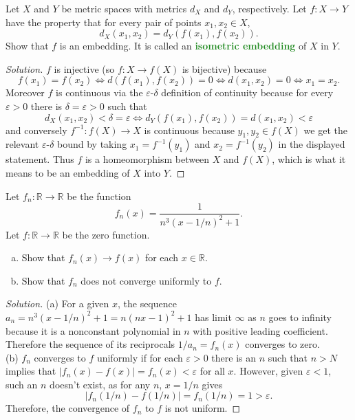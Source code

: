 \documentclass[10pt]{article}
\providecommand{\eps}{\varepsilon}
\providecommand{\RR}{\mathbb R}
\providecommand{\ii}{\item}
\providecommand{\inv}{^{-1}}
\newenvironment{soln}{\begin{proof}[Solution]}{\end{proof}}
\providecommand{\vocab}[1]{{\textbf{\textcolor{ForestGreen}{#1}}}}
\providecommand{\abs}[1]{\left|#1\right|}
\begin{document}
\begin{problem}
    [Munkres 21.2]
    Let $X$ and $Y$ be metric spaces with metrics $d_X$ and $d_Y$, respectively.
    Let $f\colon X\to Y$ have the property that
    for every pair of points $x_1,x_2\in X$,
    \begin{equation*}
	d_X(x_1,x_2) = d_Y(f(x_1), f(x_2)).
    \end{equation*}
    Show that $f$ is an embedding.
    It is called an \vocab{isometric embedding} of $X$ in $Y$.
\end{problem}

\begin{soln}
    $f$ is injective (so $f\colon X\to f(X)$ is bijective) because
    \begin{equation*}
        f(x_1)=f(x_2) \iff d(f(x_1),f(x_2)) = 0 \iff
	d(x_1,x_2)=0 \iff x_1=x_2.
    \end{equation*}
    Moreover $f$ is continuous via the $\eps$-$\delta$ definition of continuity
    because for every $\eps>0$ there is $\delta=\eps>0$ such that
    \begin{equation*}
	d_X(x_1,x_2) < \delta = \eps \iff d_Y(f(x_1),f(x_2)) = d(x_1,x_2) < \eps
    \end{equation*}
    and conversely $f\inv\colon f(X)\to X$ is continuous
    because $y_1,y_2\in f(X)$ we get the relevant $\eps$-$\delta$ bound
    by taking $x_1 = f\inv(y_1)$ and $x_2=f\inv(y_2)$ in the displayed statement.
    Thus $f$ is a homeomorphism between $X$ and $f(X)$,
    which is what it means to be an embedding of $X$ into $Y$.
\end{soln}

\begin{problem}
    [Munkres 21.9]
    Let $f_n\colon\RR\to\RR$ be the function
    \begin{equation*}
	f_n(x) = \frac{1}{n^3(x-1/n)^2 + 1}.
    \end{equation*}
    Let $f\colon\RR\to\RR$ be the zero function.
    \begin{enumerate}[(a)]
	\ii Show that $f_n(x)\to f(x)$ for each $x\in\RR$.
	\ii Show that $f_n$ does not converge uniformly to $f$.
\end{enumerate}
\end{problem}

\begin{soln}
    (a) For a given $x$, the sequence $a_n = n^3(x-1/n)^2 + 1 = n(nx - 1)^2 + 1$
    has limit $\infty$ as $n$ goes to infinity because
    it is a nonconstant polynomial in $n$
    with positive leading coefficient. Therefore the sequence
    of its reciprocals $1/a_n = f_n(x)$ converges to zero.\\

    (b) $f_n$ converges to $f$ uniformly if
    for each $\eps>0$ there is an $n$ such that $n>N$ implies that
    $|f_n(x) - f(x)| = f_n(x) < \eps$ for all $x$.
    However, given $\eps<1$, such an $n$ doesn't exist, as for any $n$,
    $x=1/n$ gives
    \begin{equation*}
	\abs{f_n(1/n) - f(1/n)} = f_n(1/n) = 1 > \eps.
    \end{equation*}
    Therefore, the convergence of $f_n$ to $f$ is not uniform.
\end{soln}
\end{document}
